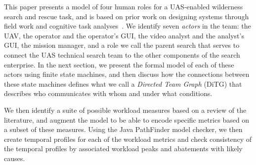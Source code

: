 This paper presents a model of four human roles for a UAS-enabled wilderness search and rescue task, and is based on prior work on designing systems through field work and cognitive task analyses~\cite{Adams2008,GoodrichMorse2008}.  We identify seven {\em actors} in the team: the UAV, the operator and the operator's GUI, the video analyst and the analyst's GUI, the mission manager, and a role we call the parent search that serves to connect the UAS technical search team to the other components of the search enterprise.  In the next section, we present the formal model of each of these actors using finite state machines, and then discuss how the connections between these state machines defines what we call a {\em Directed Team Graph} (DiTG) that describes who communicates with whom and under what conditions.

We then identify a suite of possible workload measures based on a review of the literature, and augment the model to be able to encode specific metrics based on a subset of these measures.  Using the Java PathFinder model checker, we then create temporal profiles for each of the workload metrics and check consistency of the temporal profiles by associated workload peaks and abatements with likely causes. 

